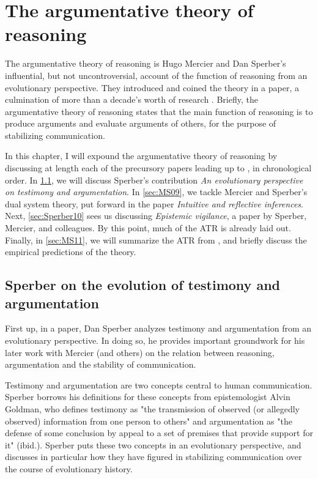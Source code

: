 \chapter{The argumentative theory of reasoning}
\label{ch:atr}

The argumentative theory of reasoning is Hugo Mercier and Dan Sperber's influential, but not uncontroversial, account of the function of reasoning from an evolutionary perspective. They introduced and coined the theory in a \citeyear{MS11} paper, a culmination of more than a decade's worth of research \citep{Sperber01, Sperber10, MS09}.
Briefly, the argumentative theory of reasoning states that the main function of reasoning is to produce arguments and evaluate arguments of others, for the purpose of stabilizing communication.

In this chapter, I will expound the argumentative theory of reasoning by discussing at length each of the precursory papers leading up to \citet{MS11}, in chronological order.
In \cref{sec:Sperber01}, we will discuss Sperber's \citeyear{Sperber01} contribution \emph{An evolutionary perspective on testimony and argumentation}. In \cref{sec:MS09}, we tackle Mercier and Sperber's dual system theory, put forward in the \citeyear{MS09} paper \emph{Intuitive and reflective inferences}.
Next, \cref{sec:Sperber10} sees us discussing \emph{Epistemic vigilance}, a \citeyear{Sperber10} paper by Sperber, Mercier, and colleagues.
By this point, much of the ATR is already laid out.
Finally, in \cref{sec:MS11}, we will summarize the ATR from \citet{MS11}, and briefly discuss the empirical predictions of the theory.

\section{Sperber on the evolution of testimony and argumentation}
\label{sec:Sperber01}

First up, in a \citeyear{Sperber01} paper, Dan Sperber analyzes testimony and argumentation from an evolutionary perspective. In doing so, he provides important groundwork for his later work with Mercier (and others) on the relation between reasoning, argumentation and the stability of communication.

Testimony and argumentation are two concepts central to human communication. Sperber borrows his definitions for these concepts from epistemologist Alvin Goldman, who defines testimony as "the transmission of observed (or allegedly observed) information from one person to others" \citep[p.~401]{Sperber01} and argumentation as "the defense of some conclusion by appeal to a set of premises that provide support for it" (ibid.).
Sperber puts these two concepts in an evolutionary perspective, and discusses in particular how they have figured in stabilizing communication over the course of evolutionary history.

